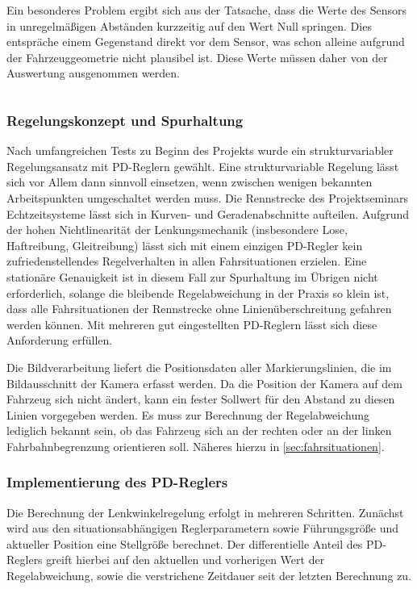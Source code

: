 Ein besonderes Problem ergibt sich aus der Tatsache, dass die Werte des Sensors in unregelmäßigen Abständen kurzzeitig auf den Wert Null springen. Dies entspräche einem Gegenstand direkt vor dem Sensor, was schon alleine aufgrund der Fahrzeuggeometrie nicht plausibel ist. Diese Werte müssen daher von der Auswertung ausgenommen werden.

\begin{lstlisting}

\end{lstlisting}

\subsubsection{Regelungskonzept und Spurhaltung}
\label{sec:wallfollower}
Nach umfangreichen Tests zu Beginn des Projekts wurde ein strukturvariabler Regelungsansatz mit PD-Reglern gewählt. Eine strukturvariable Regelung lässt sich vor Allem dann sinnvoll einsetzen, wenn zwischen wenigen bekannten Arbeitspunkten umgeschaltet werden muss. Die Rennstrecke des Projektseminars Echtzeitsysteme lässt sich in Kurven- und Geradenabschnitte aufteilen. Aufgrund der hohen Nichtlinearität der Lenkungsmechanik (insbesondere Lose, Haftreibung, Gleitreibung) lässt sich mit einem einzigen PD-Regler kein zufriedenstellendes Regelverhalten in allen Fahrsituationen erzielen. Eine stationäre Genauigkeit ist in diesem Fall zur Spurhaltung im Übrigen nicht erforderlich, solange die bleibende Regelabweichung in der Praxis so klein ist, dass alle Fahrsituationen der Rennstrecke ohne Linienüberschreitung gefahren werden können. Mit mehreren gut eingestellten PD-Reglern lässt sich diese Anforderung erfüllen.

Die Bildverarbeitung liefert die Positionsdaten aller Markierungslinien, die im Bildausschnitt der Kamera erfasst werden. Da die Position der Kamera auf dem Fahrzeug sich nicht ändert, kann ein fester Sollwert für den Abstand zu diesen Linien vorgegeben werden. Es muss zur Berechnung der Regelabweichung lediglich bekannt sein, ob das Fahrzeug sich an der rechten oder an der linken Fahrbahnbegrenzung orientieren soll. Näheres hierzu in \autoref{sec:fahrsituationen}.


\subsubsection{Implementierung des PD-Reglers}
\label{sec:pdregler}
Die Berechnung der Lenkwinkelregelung erfolgt in mehreren Schritten. Zunächst wird aus den situationsabhängigen Reglerparametern sowie Führungsgröße und aktueller Position eine Stellgröße berechnet. Der differentielle Anteil des PD-Reglers greift hierbei auf den aktuellen und vorherigen Wert der Regelabweichung, sowie die verstrichene Zeitdauer seit der letzten Berechnung zu.

